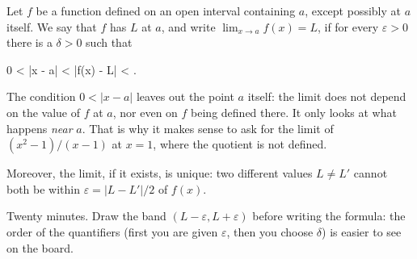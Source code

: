 
\begin{frame}


\begin{definition}[Limit]
Let $f$ be a function defined on an open interval containing $a$, except
possibly at $a$ itself. We say that $f$ has  $L$ at $a$, and
write $\lim_{x \to a} f(x) = L$, if for every $\varepsilon > 0$ there is a
$\delta > 0$ such that
\begin{keyformula}
  0 < |x - a| < \delta \implies |f(x) - L| < \varepsilon .
\end{keyformula}
\end{definition}

\begin{notesonly}
The condition $0 < |x - a|$ leaves out the point $a$ itself: the limit does
not depend on the value of $f$ at $a$, nor even on $f$ being defined there. It
only looks at what happens \emph{near} $a$. That is why it makes sense to ask
for the limit of $(x^2 - 1)/(x - 1)$ at $x = 1$, where the quotient is not
defined.

Moreover, the limit, if it exists, is unique: two different values
$L \neq L'$ cannot both be within $\varepsilon = |L - L'|/2$ of $f(x)$.
\end{notesonly}

\begin{teaching}[Pacing]
Twenty minutes. Draw the band $(L - \varepsilon, L + \varepsilon)$ before
writing the formula: the order of the quantifiers (first you are given
$\varepsilon$, then you choose $\delta$) is easier to see on the board.
\end{teaching}
\end{frame}
